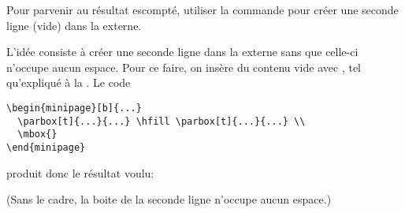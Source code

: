 \begin{exercice}
  Pour parvenir au résultat escompté, utiliser la commande \cmd{\mbox}
  pour créer une seconde ligne (vide) dans la  externe.
  \begin{sol}
    L'idée consiste à créer une seconde ligne dans la 
    externe sans que celle-ci n'occupe aucun espace. Pour ce faire, on
    insère du contenu vide avec , tel qu'expliqué à la
    . Le code
\begin{lstlisting}
\begin{minipage}[b]{...}
  \parbox[t]{...}{...} \hfill \parbox[t]{...}{...} \\
  \mbox{}
\end{minipage}
\end{lstlisting}
    produit donc le résultat voulu:
    \begin{center}
      \begin{minipage}{0.8\linewidth}
        \makebox[0pt][l]{\color{lightgray}\rule{\linewidth}{0.7pt}}\relax
        \hfill
        \hfill
      \end{minipage}
  \end{center}
  (Sans le cadre, la boite de la seconde ligne n'occupe aucun espace.)
  \end{sol}
\end{exercice}

